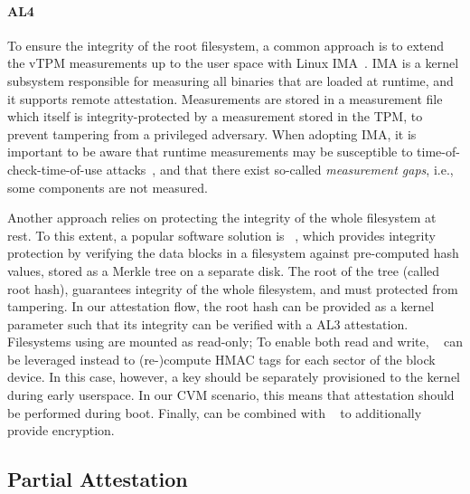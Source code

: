 \paragraph{AL4}
%
To ensure the integrity of the root filesystem, a common approach is to extend
the \ac{vTPM} measurements up to the user space with Linux
\ac{IMA}~\cite{sailer2004ima}. \ac{IMA} is a kernel subsystem responsible for
measuring all binaries that are loaded at runtime, and it supports remote
attestation. Measurements are stored in a measurement file which itself is
integrity-protected by a measurement stored in the TPM, to prevent tampering
from a privileged adversary. When adopting \ac{IMA}, it is important to be aware
that runtime measurements may be susceptible to time-of-check-time-of-use
attacks~\cite{bohling2020imatoctou}, and that there exist so-called
\emph{measurement gaps}, i.e., some components are not measured.

Another approach relies on protecting the integrity of the whole filesystem at
rest. 
To this extent, a popular software solution is \dmverity~\cite{dmVerity}, which
provides integrity protection by verifying the data blocks in a filesystem
against pre-computed hash values, stored as a Merkle tree on a separate disk.
The root of the tree (called root hash), guarantees integrity of the whole
filesystem, and must protected from tampering. In our attestation flow, the root
hash can be provided as a kernel parameter such that its integrity can be
verified with a AL3 attestation. Filesystems using \dmverity{} are mounted as
read-only; To enable both read and write, \dmintegrity{}~\cite{dmIntegrity} can
be leveraged instead to (re-)compute HMAC tags for each sector of the block
device. In this case, however, a key should be separately provisioned to the
kernel during early userspace. In our \ac{CVM} scenario, this means that
attestation should be performed during boot. Finally, \dmintegrity{} can be
combined with \dmcrypt{}~\cite{dmCrypt} to additionally provide encryption.

\subsection{Partial Attestation}
\label{section:partial-attestation}

